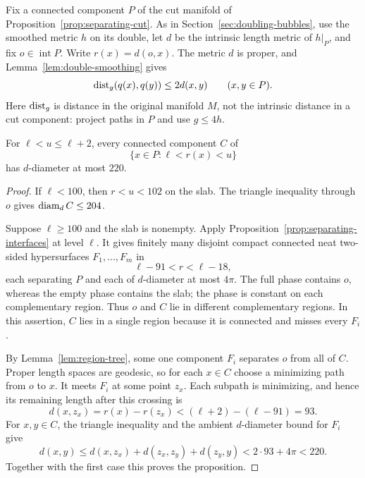 Fix a connected component $P$ of the cut manifold of
Proposition~\ref{prop:separating-cut}.  As in
Section~\ref{sec:doubling-bubbles}, use the smoothed metric $h$ on its
double, let $d$ be the intrinsic length metric of $h|_P$, and fix
$o\in\operatorname{int}P$.  Write $r(x)=d(o,x)$.  The metric $d$ is
proper, and Lemma~\ref{lem:double-smoothing} gives
\begin{equation}
\label{eq:projection-distance}
 \operatorname{dist}_g(q(x),q(y))\le 2d(x,y) \qquad (x,y\in P).
\end{equation}
Here $\operatorname{dist}_g$ is distance in the original manifold $M$, not the
intrinsic distance in a cut component: project paths in $P$ and use
$g\le 4h$.

\begin{proposition}
\label{prop:slab-diameter}
For $\ell<u\le\ell+2$, every connected component $C$ of
\[
 \{x\in P:\ell<r(x)<u\}
\]
has $d$-diameter at most $220$.
\end{proposition}

\begin{proof}
If $\ell<100$, then $r<u<102$ on the slab.  The triangle inequality
through $o$ gives $\operatorname{diam}_d C\le 204$.

Suppose $\ell\ge100$ and the slab is nonempty.  Apply
Proposition~\ref{prop:separating-interfaces} at level $\ell$.  It gives
finitely many disjoint compact connected neat two-sided hypersurfaces
$F_1,\ldots,F_m$ in
\begin{equation}
\label{eq:interface-radius-window}
 \ell-91<r<\ell-18,
\end{equation}
each separating $P$ and each of $d$-diameter at most $4\pi$.
The full phase contains $o$, whereas the empty phase contains the
slab; the phase is constant on each complementary region.  Thus $o$
and $C$ lie in different complementary regions.  In this assertion,
$C$ lies in a single region because it is connected and misses every
$F_i$.

By Lemma~\ref{lem:region-tree}, some one component $F_i$ separates
$o$ from all of $C$.  Proper length spaces are geodesic, so for each
$x\in C$ choose a minimizing path from $o$ to $x$.  It meets $F_i$
at some point $z_x$.  Each subpath is minimizing, and hence its
remaining length after this crossing is
\begin{equation}
\label{eq:slab-residual-length}
 d(x,z_x)=r(x)-r(z_x)
 < (\ell+2)-(\ell-91)=93.
\end{equation}
For $x,y\in C$, the triangle inequality and the ambient
$d$-diameter bound for $F_i$ give
\[
 d(x,y)\le d(x,z_x)+d(z_x,z_y)+d(z_y,y)
 < 2\cdot93+4\pi<220.
\]
Together with the first case this proves the proposition.
\end{proof}

